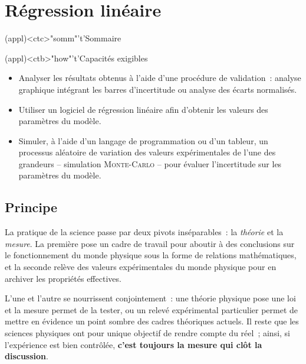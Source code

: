 \documentclass[a4paper, 12pt, garamond]{book}
\begin{document}
\setcounter{chapter}{2}


\chapter{Régression linéaire}

\vspace*{\fill}

\begin{tcn}(appl)<ctc>"somm"'t'{Sommaire}
	\let\item\olditem
	\vspace{-15pt}
	\minitoc
	\vspace{-25pt}
\end{tcn}

\begin{tcn}(appl)<ctb>"how"'t'{Capacités exigibles}
	\begin{itemize}[label=\rcheck]
    \item Analyser les résultats obtenus à l'aide d'une procédure de
          validation~: analyse graphique intégrant les barres d'incertitude ou
          analyse des écarts normalisés.
    \item Utiliser un logiciel de régression linéaire afin d'obtenir les
          valeurs des paramètres du modèle.
    \item Simuler, à l'aide d'un langage de programmation ou d'un tableur, un
          processus aléatoire de variation des valeurs expérimentales de l'une
          des grandeurs – simulation \textsc{Monte-Carlo} – pour évaluer
          l'incertitude sur les paramètres du modèle.
	\end{itemize}
\end{tcn}

\vspace*{\fill}
\newpage

\section{Principe}

La pratique de la science passe par deux pivots inséparables~: la
\textit{théorie} et la \textit{mesure}. La première pose un cadre de travail
pour aboutir à des conclusions sur le fonctionnement du monde physique sous la
forme de relations mathématiques, et la seconde relève des valeurs
expérimentales du monde physique pour en archiver les propriétés effectives.

L'une et l'autre se nourrissent conjointement~: une théorie physique pose une
loi et la mesure permet de la tester, ou un relevé expérimental particulier
permet de mettre en évidence un point sombre des cadres théoriques actuels. Il
reste que les sciences physiques ont pour unique objectif de rendre compte du
réel~; ainsi, si l'expérience est bien contrôlée, \textbf{c'est toujours la
	mesure qui clôt la discussion}.
\end{document}
